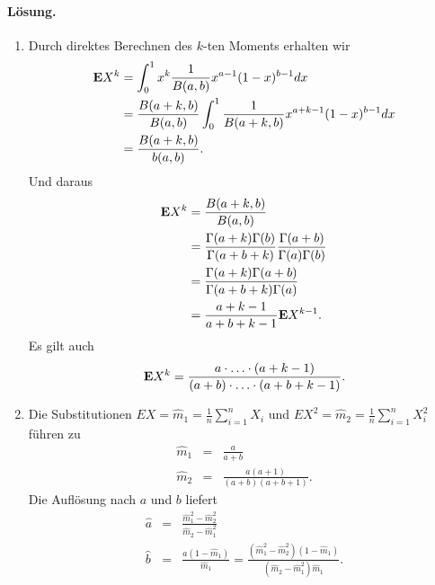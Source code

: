 \paragraph*{Lösung.}
\begin{enumerate}
    \item Durch direktes Berechnen des $k$-ten Moments erhalten wir 
        \begin{align*}
            \mathbf{E} X^k &= \int_{0}^{1} x^k \frac{1}{B(a,b)} x^{a-1}(1-x)^{b-1} dx \\
            &= \frac{B(a+k,b)}{B(a,b)} \int_{0}^{1} \frac{1}{B(a+k,b)} x^{a+k-1} (1-x)^{b-1} dx \\
            &= \frac{B(a+k,b)}{b(a,b)}.
        \end{align*}
        Und daraus
        \begin{align*}
            \mathbf{E} X^k &= \frac{B(a+k,b)}{B(a,b)} \\
            &= \frac{\Gamma(a+k)\Gamma(b)}{\Gamma(a+b+k)} \frac{\Gamma(a+b)}{\Gamma(a)\Gamma(b)} \\
            &= \frac{ \Gamma(a+k) \Gamma(a+b) }{\Gamma(a+b+k) \Gamma(a)} \\
            &= \frac{a+k-1}{a+b+k-1} \mathbf{E} X^{k-1}.
        \end{align*}
        Es gilt auch
        \begin{equation*}
            \mathbf{E} X^k = \frac{ a \cdot \ldots \cdot (a+k-1) }{ (a+b)\cdot \ldots \cdot (a+b+k-1)}.
        \end{equation*}
    \item Die Substitutionen $E X = \hat m_1 = \frac{1}{n} \sum_{i=1}^{n} X_i$ und 
        $E X^2 = \hat m_2 = \frac{1}{n} \sum_{i=1}^{n} X_i^2$ führen zu 
        \begin{eqnarray*}
            \hat m_1 &=&  \frac{a}{a+b} \\
            \hat m_2 &=&  \frac{ a(a+1) }{ (a+b)(a+b+1) }.
        \end{eqnarray*}
        Die Auflösung nach $a$ und $b$ liefert 
        \begin{eqnarray*}
            \hat a &=& \frac{ \hat m_1^2 - \hat m_2^2 }{ \hat m_2 - \hat m_1^2  } \\
            \hat b &=& \frac{a (1-\hat m_1)}{\hat m_1} = \frac{ (\hat m_1^2 - \hat m_2^2)(1-\hat m_1) }{(\hat m_2 - \hat m_1^2)\hat m_1}.
        \end{eqnarray*}
\end{enumerate}









